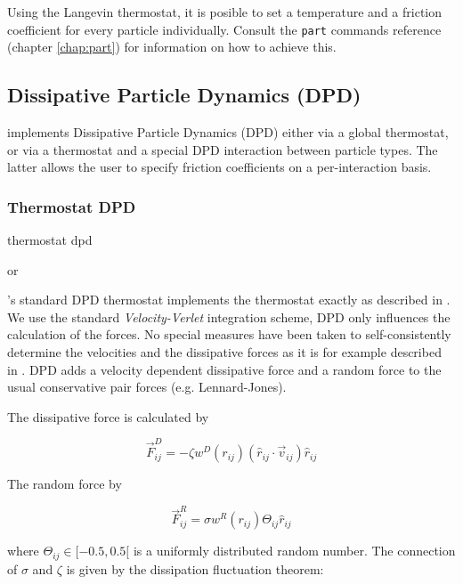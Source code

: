 Using the Langevin thermostat, it is posible to set a temperature and
a friction coefficient for every particle individually. Consult the
\texttt{part} commands reference (chapter \ref{chap:part}) for
information on how to achieve this.

\subsection{Dissipative Particle Dynamics (DPD) } \label{sec:DPD}

\es implements Dissipative Particle Dynamics (DPD) either via a global
thermostat, or via a thermostat and a special DPD interaction between
particle types.  The latter allows the user to specify friction
coefficients on a per-interaction basis.

\subsubsection{Thermostat DPD}

\begin{essyntax}
  thermostat dpd    
  \begin{features}
     or 
  \end{features}
\end{essyntax}

\es's standard DPD thermostat implements the thermostat exactly as
described in \cite{soddeman03a}.  We use the standard
\textit{Velocity-Verlet} integration scheme, \eg DPD only influences
the calculation of the forces. No special measures have been taken to
self-consistently determine the velocities and the dissipative forces
as it is for example described in \cite{Nikunen03}.  DPD adds a
velocity dependent dissipative force and a random force to the usual
conservative pair forces (e.g. Lennard-Jones).

The dissipative force is calculated by

$$ \vec{F}_{ij}^{D} = -\zeta w^D (r_{ij}) (\hat{r}_{ij} \cdot \vec{v}_{ij}) \hat{r}_{ij} $$

The random force by

$$ \vec{F}_{ij}^R = \sigma w^R (r_{ij}) \Theta_{ij} \hat{r}_{ij} $$

where $ \Theta_{ij} \in [ -0.5 , 0.5 [ $ is a uniformly distributed random number.
The connection of $\sigma $ and $\zeta $ is given by the dissipation fluctuation theorem:
 
